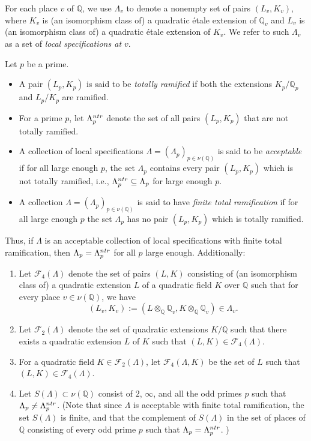 \documentclass[10pt,a4paper]{amsart}
\def\FF{{\mathcal F}}
\def\Q{{\mathbb Q}}
\def\Val{{\nu}}
\def\bQ{{\mathbb Q}}
\def\cF{{\mathcal F}}
\begin{document}
\begin{defn}\label{localspec}
For each place $v$ of $\Q$, we use $\Lambda_v$ to denote a nonempty set of pairs
$(L_v,K_v)$, where $K_v$ is (an isomorphism class of) a quadratic \'etale extension of $\Q_v$
and $L_v$ is (an isomorphism class of) a quadratic \'etale extension of $K_v$. We refer to such $\Lambda_v$ as a set of {\em local specifications at $v$}. 

Let $p$ be a prime. 
\begin{itemize}
    \item A pair $(L_p,K_p)$ is said to be {\it totally ramified} if both the
extensions $K_p/\Q_p$ and $L_p/K_p$ are ramified.
    \item For a prime $p$, let $\Lambda_p^{\rm ntr}$ denote the set of all pairs $(L_p,K_p)$ that are not totally ramified.
    \item A collection of local specifications
$\Lambda=(\Lambda_p)_{p \in \nu(\bQ)}$ is said to be {\it acceptable} if for all
large enough $p$, the set $\Lambda_p$ contains every pair
$(L_p,K_p)$ which is not totally ramified, i.e., $\Lambda_p^{\rm ntr} \subseteq \Lambda_p$ for large enough $p$. 
    \item  A collection $\Lambda = (\Lambda_p)_{p \in \nu(\bQ)}$ is
said to have {\it finite total ramification} if for all large enough
$p$ the set $\Lambda_p$ has no pair $(L_p,K_p)$ which is totally
ramified.
\end{itemize}
Thus, if $\Lambda$ is an acceptable collection of local specifications with finite total ramification, then $\Lambda_p = \Lambda_p^{\rm ntr}$  for all $p$ large enough. Additionally: 
\begin{enumerate}
\item[\rm(a)]  Let $\cF_4(\Lambda)$ denote the set of pairs $(L, K)$
  consisting of (an isomorphism class of) a quadratic extension $L$ of
  a quadratic field $K$ over $\Q$ such that for every place $v \in \nu(\Q)$, we have
  $$(L_v,K_v):=(L \otimes_{\bQ} \bQ_v, K\otimes_{\bQ} \bQ_v) \in
  \Lambda_v.$$
\item[{\rm (b)}] Let $\FF_2(\Lambda)$ denote the set of quadratic
  extensions $K/\bQ$ such that there exists a quadratic extension $L$
  of $K$ such that $(L,K) \in \cF_4(\Lambda)$.
\item[{\rm (c)}] For a quadratic field $K \in \FF_2(\Lambda)$, let $\FF_4(\Lambda,K)$ be
  the set of $L$ such that $(L,K)\in\FF_4(\Lambda)$.
  \item[{\rm (d)}]   Let $S(\Lambda)\subset\Val(\bQ)$ 
consist of $2$, $\infty$, and all the odd primes $p$ such that
$\Lambda_p \neq \Lambda_p^{\rm ntr}$. (Note that since $\Lambda$ is acceptable with finite total
ramification, the set $S(\Lambda)$ is finite, and that the complement of $S(\Lambda)$ in the set of places of $\Q$ consisting of every odd prime $p$ such that $\Lambda_p = \Lambda_p^{\rm ntr}$. ) 


\end{enumerate}
\end{defn}
\end{document}
